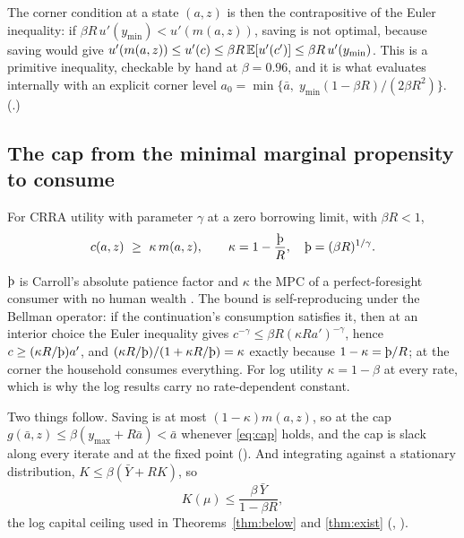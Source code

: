 The corner condition at a state $(a,z)$ is then the contrapositive of the Euler inequality: if
$\beta R\,u'(y_{\min})<u'(m(a,z))$, saving is not optimal, because saving would give
$u'(m(a,z))\le u'(c)\le\beta R\,\mathbb{E}[u'(c')]\le\beta R\,u'(y_{\min})$. This is a primitive
inequality, checkable by hand at $\beta=0.96$, and it is what
 evaluates internally with an explicit corner
level $a_0=\min\{\bar a,\;y_{\min}(1-\beta R)/(2\beta R^2)\}$.
(.)

\subsection{The cap from the minimal marginal propensity to consume}\label{sec:mpc}

\begin{lemma}
For CRRA utility with parameter $\gamma$ at a zero borrowing limit, with $\beta R<1$,
\[
  c(a,z)\ \ge\ \kappa\, m(a,z),\qquad \kappa=1-\frac{\Thorn}{R},\quad \Thorn=(\beta R)^{1/\gamma}.
\]
\end{lemma}

$\Thorn$ is Carroll's absolute patience factor and $\kappa$ the MPC of a perfect-foresight consumer
with no human wealth \citep{CarrollShanker2026}. The bound is self-reproducing under the Bellman
operator: if the continuation's consumption satisfies it, then at an interior choice the Euler
inequality gives $c^{-\gamma}\le\beta R(\kappa R a')^{-\gamma}$, hence $c\ge(\kappa R/\Thorn)a'$, and
$(\kappa R/\Thorn)/(1+\kappa R/\Thorn)=\kappa$ exactly because $1-\kappa=\Thorn/R$; at the corner
the household consumes everything. For log utility $\kappa=1-\beta$ at every rate, which is why the
log results carry no rate-dependent constant.

Two things follow. Saving is at most $(1-\kappa)m(a,z)$, so at the cap
$g(\bar a,z)\le\beta(y_{\max}+R\bar a)<\bar a$ whenever \eqref{eq:cap} holds, and the cap is slack
along every iterate and at the fixed point (). And
integrating against a stationary distribution, $K\le\beta(\bar Y+RK)$, so
\begin{equation}\label{eq:ceiling}
  K(\mu)\le\frac{\beta\,\bar Y}{1-\beta R},
\end{equation}
the log capital ceiling used in Theorems~\ref{thm:below} and \ref{thm:exist}
(, ).

